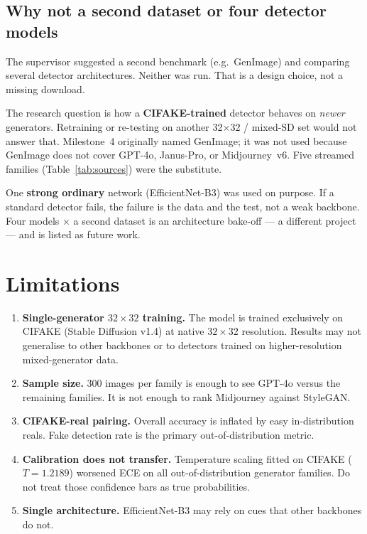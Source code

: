 \documentclass[12pt,a4paper]{article}
\begin{document}
\subsection{Why not a second dataset or four detector models}

The supervisor suggested a second benchmark (e.g.\ GenImage) and comparing several detector architectures. Neither was run. That is a design choice, not a missing download.

The research question is how a \textbf{CIFAKE-trained} detector behaves on \emph{newer} generators. Retraining or re-testing on another 32$\times$32 / mixed-SD set would not answer that. Milestone~4 originally named GenImage; it was not used because GenImage does not cover GPT-4o, Janus-Pro, or Midjourney~v6. Five streamed families (Table~\ref{tab:sources}) were the substitute.

One \textbf{strong ordinary} network (EfficientNet-B3) was used on purpose. If a standard detector fails, the failure is the data and the test, not a weak backbone. Four models $\times$ a second dataset is an architecture bake-off --- a different project --- and is listed as future work.

\section{Limitations}

\begin{enumerate}[noitemsep]
    \item \textbf{Single-generator $32\times32$ training.} The model is trained exclusively on CIFAKE (Stable Diffusion v1.4) at native $32\times32$ resolution. Results may not generalise to other backbones or to detectors trained on higher-resolution mixed-generator data.

    \item \textbf{Sample size.} 300 images per family is enough to see GPT-4o versus the remaining families. It is not enough to rank Midjourney against StyleGAN.

    \item \textbf{CIFAKE-real pairing.} Overall accuracy is inflated by easy in-distribution reals. Fake detection rate is the primary out-of-distribution metric.

    \item \textbf{Calibration does not transfer.} Temperature scaling fitted on CIFAKE ($T = 1.2189$) worsened ECE on all out-of-distribution generator families. Do not treat those confidence bars as true probabilities.

    \item \textbf{Single architecture.} EfficientNet-B3 may rely on cues that other backbones do not.
\end{enumerate}
\end{document}
